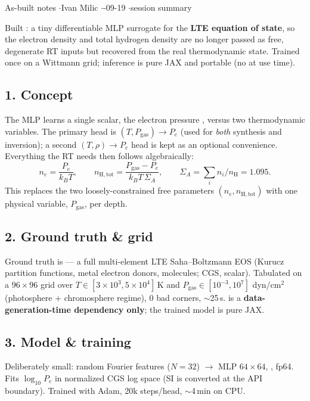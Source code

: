 


%
{As-built notes \quad$\cdot$\quad Ivan Milic \quad$\cdot$-09-19 \quad$\cdot$\quad session summary}

Built : a tiny differentiable MLP surrogate for the \textbf{LTE equation of state}, so
the electron density  and total hydrogen density  are no longer passed as free,
degenerate RT inputs but recovered from the real thermodynamic state. Trained once on a Wittmann grid;
inference is pure JAX and portable (no  at use time).

\subsection*{1. Concept}
The MLP learns a single scalar, the electron pressure , versus two thermodynamic variables. The
primary head is $(T, P_\mathrm{gas})\!\to\!P_e$ (used for \emph{both} synthesis and inversion); a second
$(T,\rho)\!\to\!P_e$ head is kept as an optional convenience. Everything the RT needs then follows
algebraically:
\[
n_e = \frac{P_e}{k_B T},\qquad
n_{\mathrm H,\mathrm{tot}} = \frac{P_\mathrm{gas}-P_e}{k_B T\,\Sigma_A},\qquad
\Sigma_A=\textstyle\sum_i n_i/n_\mathrm H = 1.095 .
\]
This replaces the two loosely-constrained free parameters $(n_e, n_{\mathrm H,\mathrm{tot}})$ with one
physical variable, $P_\mathrm{gas}$, per depth.

\subsection*{2. Ground truth \& grid}
Ground truth is  --- a full multi-element LTE Saha--Boltzmann EOS
(Kurucz partition functions, metal electron donors, molecules; CGS, scalar). Tabulated on a
$96\times96$ grid over $T\in[3\times10^3,5\times10^4]$\,K and $P_\mathrm{gas}\in[10^{-3},10^{7}]$
dyn/cm$^2$ (photosphere + chromosphere regime), 0 bad corners, $\sim$25\,s.  is a
\textbf{data-generation-time dependency only}; the trained model is pure JAX.

\subsection*{3. Model \& training}
Deliberately small: random Fourier features ($N{=}32$) $\to$ MLP $64\times64$, , fp64. Fits
$\log_{10}P_e$ in normalized CGS log space (SI is converted at the API boundary). Trained with
 Adam, 20k steps/head, $\sim$4\,min on CPU.

